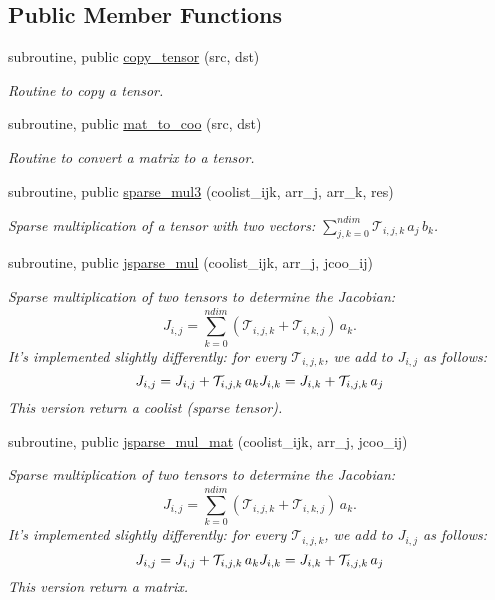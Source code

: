 \subsection*{Public Member Functions}
\begin{DoxyCompactItemize}
\item 
subroutine, public \hyperlink{classtensor_a4a88ee8077278486c5128ad97617969e}{copy\-\_\-tensor} (src, dst)
\begin{DoxyCompactList}\small\item\em Routine to copy a tensor. \end{DoxyCompactList}\item 
subroutine, public \hyperlink{classtensor_a75d1a9ca8b39e9ad4b151a7b4b45c70f}{mat\-\_\-to\-\_\-coo} (src, dst)
\begin{DoxyCompactList}\small\item\em Routine to convert a matrix to a tensor. \end{DoxyCompactList}\item 
subroutine, public \hyperlink{classtensor_a11054027a386918658f8948231af53b1}{sparse\-\_\-mul3} (coolist\-\_\-ijk, arr\-\_\-j, arr\-\_\-k, res)
\begin{DoxyCompactList}\small\item\em Sparse multiplication of a tensor with two vectors\-: ${\displaystyle \sum_{j,k=0}^{ndim}} \mathcal{T}_{i,j,k} \, a_j \,b_k$. \end{DoxyCompactList}\item 
subroutine, public \hyperlink{classtensor_add2a6aa993cd8a23be60d1643b5c7942}{jsparse\-\_\-mul} (coolist\-\_\-ijk, arr\-\_\-j, jcoo\-\_\-ij)
\begin{DoxyCompactList}\small\item\em Sparse multiplication of two tensors to determine the Jacobian\-: \[J_{i,j} = {\displaystyle \sum_{k=0}^{ndim}} \left( \mathcal{T}_{i,j,k} + \mathcal{T}_{i,k,j} \right) \, a_k.\] It's implemented slightly differently\-: for every $\mathcal{T}_{i,j,k}$, we add to $J_{i,j}$ as follows\-: \[J_{i,j} = J_{i,j} + \mathcal{T}_{i,j,k} \, a_k \\ J_{i,k} = J_{i,k} + \mathcal{T}_{i,j,k} \, a_j\] This version return a coolist (sparse tensor). \end{DoxyCompactList}\item 
subroutine, public \hyperlink{classtensor_a4135cf70df5030070922ff199c79cc03}{jsparse\-\_\-mul\-\_\-mat} (coolist\-\_\-ijk, arr\-\_\-j, jcoo\-\_\-ij)
\begin{DoxyCompactList}\small\item\em Sparse multiplication of two tensors to determine the Jacobian\-: \[J_{i,j} = {\displaystyle \sum_{k=0}^{ndim}} \left( \mathcal{T}_{i,j,k} + \mathcal{T}_{i,k,j} \right) \, a_k.\] It's implemented slightly differently\-: for every $\mathcal{T}_{i,j,k}$, we add to $J_{i,j}$ as follows\-: \[J_{i,j} = J_{i,j} + \mathcal{T}_{i,j,k} \, a_k \\ J_{i,k} = J_{i,k} + \mathcal{T}_{i,j,k} \, a_j\] This version return a matrix. \end{DoxyCompactList}\item 

\end{DoxyCompactItemize}
